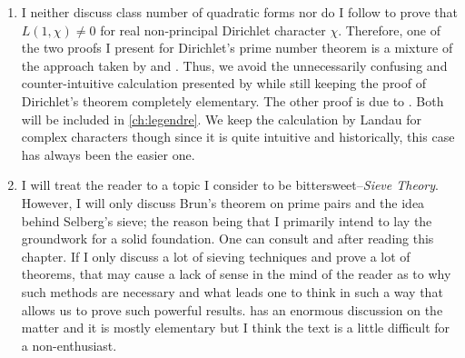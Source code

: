 \documentclass[12pt, leqno]{book}
\theoremstyle{definition}
\begin{document}
		\begin{enumerate}
			\item I neither discuss class number of quadratic forms nor do I follow \textcite[Part Two, Chapter III]{landau_1969} to prove that $L(1,\chi)\neq0$ for real non-principal Dirichlet character $\chi$. Therefore, one of the two proofs I present for Dirichlet's prime number theorem is a mixture of the approach taken by \textcite[Part two, Chapter III, $\S$3]{landau_1969} and \textcite[Chapter VI]{apostol_1976}. Thus, we avoid the unnecessarily confusing and counter-intuitive calculation presented by \textcite[Theorem 152]{landau_1969} while still keeping the proof of Dirichlet's theorem completely elementary. The other proof is due to \textcite{selberg_1949}. Both will be included in \autoref{ch:legendre}. We keep the calculation by Landau for complex characters though since it is quite intuitive and historically, this case has always been the easier one.
			\item I will treat the reader to a topic I consider to be bittersweet--\textit{Sieve Theory}. However, I will only discuss Brun's theorem on prime pairs and the idea behind Selberg's sieve; the reason being that I primarily intend to lay the groundwork for a solid foundation. One can consult \textcite{cojocaru_murty_2006} and \textcite{friedlander_iwaniec_2010} after reading this chapter. If I only discuss a lot of sieving techniques and prove a lot of theorems, that may cause a lack of sense in the mind of the reader as to why such methods are necessary and what leads one to think in such a way that allows us to prove such powerful results. \textcite{friedlander_iwaniec_2010} has an enormous discussion on the matter and it is mostly elementary but I think the text is a little difficult for a non-enthusiast.

\end{enumerate}
\end{document}

